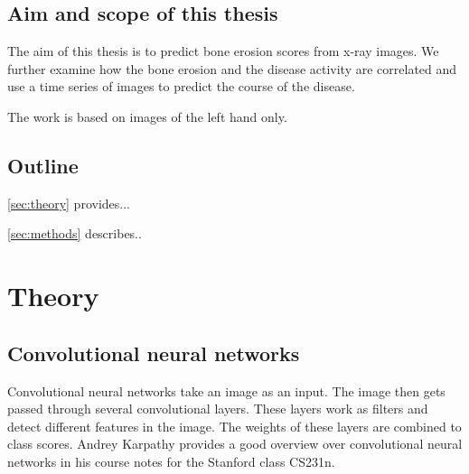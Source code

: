 \documentclass[12pt]{article}
\begin{document}




\subsection{Aim and scope of this thesis}

The aim of this thesis is to predict bone erosion scores from x-ray images. We further examine how the bone erosion and the disease activity are correlated and use a time series of images to predict the course of the disease.

The work is based on images of the left hand only. 



\subsection{Outline}

\autoref{sec:theory} provides...

\noindent\autoref{sec:methods} describes..


\newpage




\section{Theory}
\label{sec:theory}

\subsection{Convolutional neural networks}
\label{subsec:cnn}
Convolutional neural networks take an image as an input. The image then gets passed through several convolutional layers. These layers work as filters and detect different features in the image. The weights of these layers are combined to class scores. Andrey Karpathy provides a good overview over convolutional neural networks in his course notes for the Stanford class CS231n. \cite{cnn}
\end{document}
